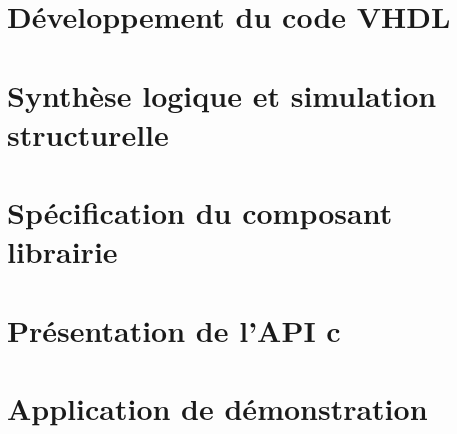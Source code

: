 \documentclass[a4paper, 11pt, svgnames]{report}
\begin{document}
    \chapter{Développement du code VHDL}
    \chapter{Synthèse logique et simulation structurelle}
    \chapter{Spécification du composant librairie}
    \chapter{Présentation de l'API c}
    \chapter{Application de démonstration}

    \begin{thebibliography}{99}
    \end{thebibliography}

    \begin{appendices}
    \end{appendices}
\end{document}

